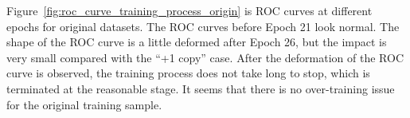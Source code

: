 \documentclass[12pt]{article}
\begin{document}
			Figure~\ref{fig:roc_curve_training_process_origin} is ROC curves at different epochs for original datasets. The ROC curves before Epoch 21 look normal. The shape of the ROC curve is a little deformed after Epoch 26, but the impact is very small compared with the ``+1 copy'' case. After the deformation of the ROC curve is observed, the training process does not take long to stop, which is terminated at the reasonable stage. It seems that there is no over-training issue for the original training sample.
			\begin{figure}[htpb]
				\centering
				 \\
\end{figure}
\end{document}
